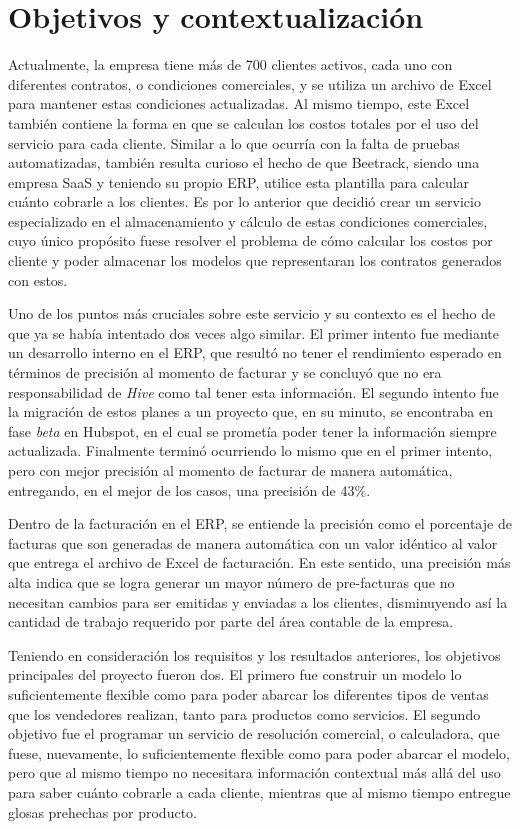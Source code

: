 \section{Objetivos y contextualización}

  Actualmente, la empresa tiene más de 700 clientes activos, cada uno con diferentes contratos, o condiciones comerciales, y se utiliza un archivo de Excel para mantener estas condiciones actualizadas. Al mismo tiempo, este Excel también contiene la forma en que se calculan los costos totales por el uso del servicio para cada cliente. Similar a lo que ocurría con la falta de pruebas automatizadas, también resulta curioso el hecho de que Beetrack, siendo una empresa SaaS y teniendo su propio ERP, utilice esta plantilla para calcular cuánto cobrarle a los clientes. Es por lo anterior que decidió crear un servicio especializado en el almacenamiento y cálculo de estas condiciones comerciales, cuyo único propósito fuese resolver el problema de cómo calcular los costos por cliente y poder almacenar los modelos que representaran los contratos generados con estos.
  
  Uno de los puntos más cruciales sobre este servicio y su contexto es el hecho de que ya se había intentado dos veces algo similar. El primer intento fue mediante un desarrollo interno en el ERP, que resultó no tener el rendimiento esperado en términos de precisión al momento de facturar y se concluyó que no era responsabilidad de \textit{Hive} como tal tener esta información. El segundo intento fue la migración de estos planes a un proyecto que, en su minuto, se encontraba en fase \textit{beta} en Hubspot, en el cual se prometía poder tener la información siempre actualizada. Finalmente terminó ocurriendo lo mismo que en el primer intento, pero con mejor precisión al momento de facturar de manera automática, entregando, en el mejor de los casos, una precisión de 43\%.

  Dentro de la facturación en el ERP, se entiende la precisión como el porcentaje de facturas que son generadas de manera automática con un valor idéntico al valor que entrega el archivo de Excel de facturación. En este sentido, una precisión más alta indica que se logra generar un mayor número de pre-facturas que no necesitan cambios para ser emitidas y enviadas a los clientes, disminuyendo así la cantidad de trabajo requerido por parte del área contable de la empresa.

  Teniendo en consideración los requisitos y los resultados anteriores, los objetivos principales del proyecto fueron dos. El primero fue construir un modelo lo suficientemente flexible como para poder abarcar los diferentes tipos de ventas que los vendedores realizan, tanto para productos como servicios. El segundo objetivo fue el programar un servicio de resolución comercial, o calculadora, que fuese, nuevamente, lo suficientemente flexible como para poder abarcar el modelo, pero que al mismo tiempo no necesitara información contextual más allá del uso para saber cuánto cobrarle a cada cliente, mientras que al mismo tiempo entregue glosas prehechas por producto.

